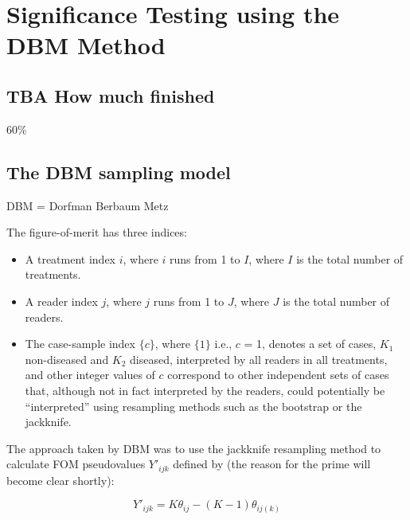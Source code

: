 \documentclass[
]{book}
\providecommand{\tightlist}{%
  \setlength{\itemsep}{0pt}\setlength{\parskip}{0pt}}
\begin{document}
\hypertarget{dbm-analysis-significance-testing}{%
\chapter{Significance Testing using the DBM Method}\label{dbm-analysis-significance-testing}}

\hypertarget{dbm-analysis-significance-testing-how-much-finished}{%
\section{TBA How much finished}\label{dbm-analysis-significance-testing-how-much-finished}}

60\%

\hypertarget{the-dbm-sampling-model}{%
\section{The DBM sampling model}\label{the-dbm-sampling-model}}

DBM = Dorfman Berbaum Metz

The figure-of-merit has three indices:

\begin{itemize}
\tightlist
\item
  A treatment index \(i\), where \(i\) runs from 1 to \(I\), where \(I\) is the total number of treatments.\\
\item
  A reader index \(j\), where \(j\) runs from 1 to \(J\), where \(J\) is the total number of readers.\\
\item
  The case-sample index \(\{c\}\), where \(\{1\}\) i.e., \(c\) = 1, denotes a set of cases, \(K_1\) non-diseased and \(K_2\) diseased, interpreted by all readers in all treatments, and other integer values of \(c\) correspond to other independent sets of cases that, although not in fact interpreted by the readers, could potentially be ``interpreted'' using resampling methods such as the bootstrap or the jackknife.
\end{itemize}

The approach \citep{RN204} taken by DBM was to use the jackknife resampling method to calculate FOM pseudovalues \({Y'}_{ijk}\) defined by (the reason for the prime will become clear shortly):

\begin{equation}
Y'_{ijk}=K\theta_{ij}-(K-1)\theta_{ij(k)}
\label{eq:pseudoValPrime}
\end{equation}
\end{document}
